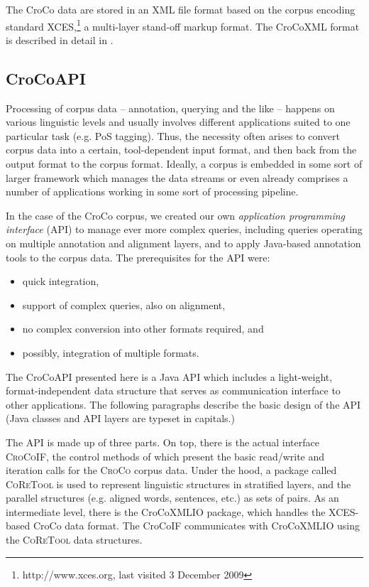 \documentclass[output=paper]{LSP/langsci}
\begin{document}
The CroCo data are stored in an XML file format based on the corpus encoding standard XCES,\footnote{http://www.xces.org, last visited 3 December 2009} a multi-layer stand-off markup format. The CroCoXML format is described in detail in \citet{Hansen-SchirraEtAl2006,Hansen-Schirra2012}.

\subsection{CroCoAPI}\label{sec:culo:3.2}

Processing of corpus data -- annotation, querying and the like -- happens on various linguistic levels and usually involves different applications suited to one particular task (e.g. PoS tagging). Thus, the necessity often arises to convert corpus data into a certain, tool-dependent input format, and then back from the output format to the corpus format. Ideally, a corpus is embedded in some sort of larger framework which manages the data streams or even already comprises a number of applications working in some sort of processing pipeline.

In the case of the CroCo corpus, we created our own \textit{application programming interface} (API) to manage ever more complex queries, including queries operating on multiple annotation and alignment layers, and to apply Java-based annotation tools to the corpus data. The prerequisites for the API were:


\begin{itemize}
\item  
quick integration,
\item  
support of complex queries, also on alignment, 
\item  
no complex conversion into other formats required, and
\item  
possibly, integration of multiple formats.
\end{itemize}

The CroCoAPI presented here is a Java API which includes a light-weight, format-independent data structure that serves as communication interface to other applications. The following paragraphs describe the basic design of the API (Java classes and API layers are typeset in capitals.)

The API is made up of three parts. On top, there is the actual interface \textsc{CroCoIF}, the control methods of which present the basic read/write and iteration calls for the \textsc{CroCo} corpus data. Under the hood, a package called \textsc{CoReTool} is used to represent linguistic structures in stratified layers, and the parallel structures (e.g. aligned words, sentences, etc.) as sets of pairs. As an intermediate level, there is the CroCoXMLIO package, which handles the XCES-based CroCo data format. The CroCoIF communicates with CroCoXMLIO using the \textsc{CoReTool} data structures.
\end{document}
